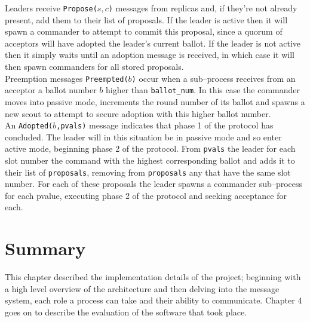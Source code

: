 Leaders receive \texttt{Propose($s,c$)} messages from replicas and, if they're not already present, add them to their list of proposals. If the leader is active then it will spawn a commander to attempt to commit this proposal, since a quorum of acceptors will have adopted the leader's current ballot. If the leader is not active then it simply waits until an adoption message is received, in which case it will then spawn commanders for all stored proposals. \\

Preemption messages \texttt{Preempted($b$)} occur when a sub--process receives from an acceptor a ballot number $b$ higher than \texttt{ballot\_num}. In this case the commander moves into passive mode, increments the round number of its ballot and spawns a new scout to attempt to secure adoption with this higher ballot number. \\

An \texttt{Adopted($b$,pvals)} message indicates that phase 1 of the protocol has concluded. The leader will in this situation be in passive mode and so enter active mode, beginning phase 2 of the protocol. {\color{red}From \texttt{pvals} the leader for each slot number the command with the highest corresponding ballot and adds it to their list of \texttt{proposals}, removing from \texttt{proposals} any that have the same slot number.} For each of these proposals the leader spawns a commander sub--process for each pvalue, executing phase 2 of the protocol and seeking acceptance for each.

\section{Summary}

This chapter described the implementation details of the project; beginning with a high level overview of the architecture and then delving into the message system, each role a process can take and their ability to communicate. Chapter 4 goes on to describe the evaluation of the software that took place.








